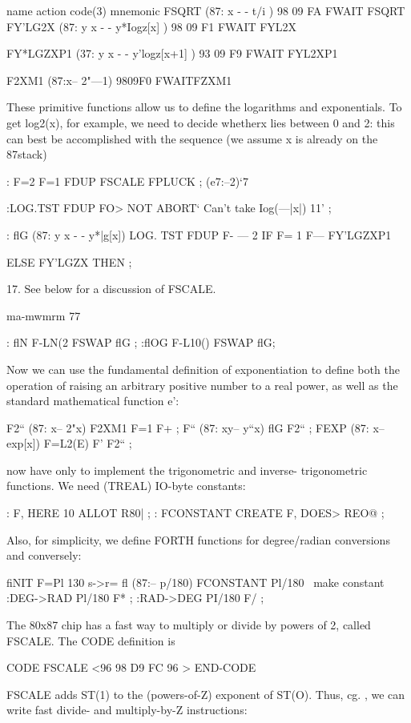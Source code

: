 {{ 

name action code(3) mnemonic
FSQRT (87: x - - t/i ) 98 09 FA FWAIT FSQRT
FY'LG2X (87: y x - - y*Iogz[x] ) 98 09 F1 FWAIT FYL2X

FY*LGZXP1 (37: y x - - y'logz[x+1] ) 93 09 F9 FWAIT FYL2XP1

F2XM1 (87:x-- 2"—1) 9809F0 FWAITFZXM1

 

 

 

These primitive functions allow us to define the logarithms and
exponentials. To get log2(x), for example, we need to decide
whetherx lies between 0 and 2: this can best be accomplished with
the sequence (we assume x is already on the 87stack)

: F=2 F=1 FDUP FSCALE FPLUCK ; (e7:--2)‘7

:LOG.TST FDUP FO> NOT
ABORT‘ Can't take Iog(—|x|) 11' ;

: flG (87: y x - - y*|g[x])
LOG. TST FDUP F- — 2
IF F= 1 F— FY'LGZXP1

ELSE FY'LGZX THEN ;

 

17. See below for a discussion of FSCALE.

ma-mwmrm 77

: flN F-LN(2 FSWAP flG ;
:flOG F-L10() FSWAP flG;

Now we can use the fundamental definition of exponentiation to define both the operation of raising an arbitrary positive number to a real power, as well as the standard mathematical function e’:

F2“ (87: x-- 2"x) F2XM1 F=1 F+ ;
F“ (87: xy-- y“x) flG F2“ ;
FEXP (87: x-- exp[x]) F=L2(E) F' F2“ ;

 now have only to implement the trigonometric and inverse-
trigonometric functions. We need (TREAL) IO-byte constants:

: F, HERE 10 ALLOT R80| ;
: FCONSTANT CREATE F, DOES> REO@ ;

Also, for simplicity, we define FORTH functions for degree/radian conversions and conversely:

fiNIT F=Pl 130 s->r= fl (87:-- p/180)
FCONSTANT Pl/180 \ make constant
:DEG->RAD Pl/180 F* ;
:RAD->DEG PI/180 F/ ;

The 80x87 chip has a fast way to multiply or divide by powers of
2, called FSCALE. The CODE definition is

CODE FSCALE <96 98 D9 FC 96 > END-CODE

FSCALE adds ST(1) to the (powers-of-Z) exponent of ST(O).
Thus, cg. , we can write fast divide- and multiply-by-Z instructions:

}}
